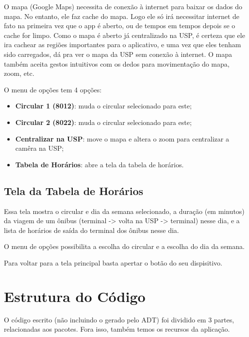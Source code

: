 O mapa (Google Maps) necessita de conexão à internet para baixar os dados do mapa. No entanto, ele faz cache 
do mapa. Logo ele só irá necessitar internet de fato na primeira vez que o app é aberto, ou de tempos em tempos
depois se o cache for limpo. Como o mapa é aberto já centralizado na USP, é certeza que ele ira cachear as
regiões importantes para o aplicativo, e uma vez que eles tenham sido carregados, dá pra ver o mapa da USP
sem conexão à internet.
O mapa também aceita gestos intuitivos com os dedos para movimentação do mapa, zoom, etc.

O menu de opções tem 4 opções:
\begin{itemize}
    \item \textbf{Circular 1 (8012)}: muda o circular selecionado para este;
    \item \textbf{Circular 2 (8022)}: muda o circular selecionado para este;
    \item \textbf{Centralizar na USP}: move o mapa e altera o zoom para centralizar a camêra na USP;
    \item \textbf{Tabela de Horários}: abre a tela da tabela de horários.
\end{itemize}

\subsection{Tela da Tabela de Horários}
Essa tela mostra o circular e dia da semana selecionado, a duração (em minutos) da viagem de um ônibus
(terminal -> volta na USP -> terminal) nesse dia, e a lista de horários de saída do terminal dos ônibus
nesse dia.

O menu de opções possibilita a escolha do circular e a escolha do dia da semana.

Para voltar para a tela principal basta apertar o botão  do seu dispisitivo.

\section{Estrutura do Código}
O código escrito (não incluindo o gerado pelo ADT) foi dividido
em 3 partes, relacionadas aos pacotes. Fora isso, também temos os
recursos da aplicação.

